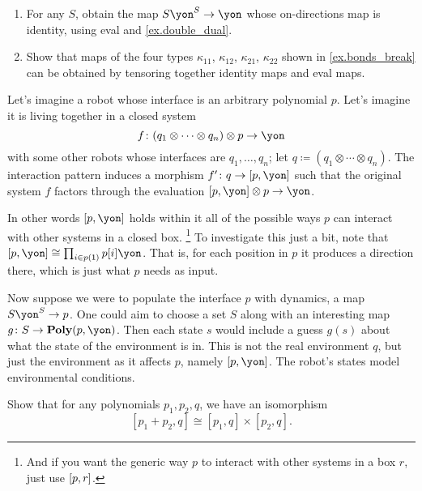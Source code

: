 \documentclass[Book-Poly]{subfiles}
\begin{document}
\begin{exercise}
\begin{enumerate}
	\item For any $S$, obtain the map $S\yon^S\to\yon$ whose on-directions map is identity, using eval and \cref{ex.double_dual}.
	\item Show that maps of the four types $\kappa_{11}$, $\kappa_{12}$, $\kappa_{21}$, $\kappa_{22}$ shown in \cref{ex.bonds_break} can be obtained by tensoring together identity maps and eval maps.
\qedhere
\end{enumerate}
\end{exercise}

\begin{example}
Let's imagine a robot whose interface is an arbitrary polynomial $p$. Let's imagine it is living together in a closed system
\[
	f\colon (q_1\otimes\cdots\otimes q_n)\otimes p\to \yon
\]
with some other robots whose interfaces are $q_1,\ldots,q_n$; let $q\coloneqq(q_1\otimes\cdots\otimes q_n)$. The interaction pattern induces a morphism $f'\colon q\to \ihom{p,\yon}$ such that the original system $f$ factors through the evaluation $\ihom{p,\yon}\otimes p\to \yon$.

In other words $\ihom{p,\yon}$ holds within it all of the possible ways $p$ can interact with other systems in a closed box.%
\footnote{And if you want the generic way $p$ to interact with other systems in a box $r$, just use $[p,r]$.}
To investigate this just a bit, note that $\ihom{p,\yon}\cong\prod_{i\in p(\1)}p[i]\yon$. That is, for each position in $p$ it produces a direction there, which is just what $p$ needs as input.

Now suppose we were to populate the interface $p$ with dynamics, a map $S\yon^S\to p$. One could aim to choose a set $S$ along with an interesting map $g\colon S\to\poly(p,\yon)$. Then each state $s$ would include a guess $g(s)$ about what the state of the environment is in. This is not the real environment $q$, but just the environment as it affects $p$, namely $\ihom{p,\yon}$. The robot's states model environmental conditions.
\end{example}


\begin{exercise}\label{exc.sum_times_closure}
Show that for any polynomials $p_1,p_2,q$, we have an isomorphism
\[
[p_1+p_2,q]\cong[p_1,q]\times[p_2,q].
\]
\end{exercise}
\end{document}
